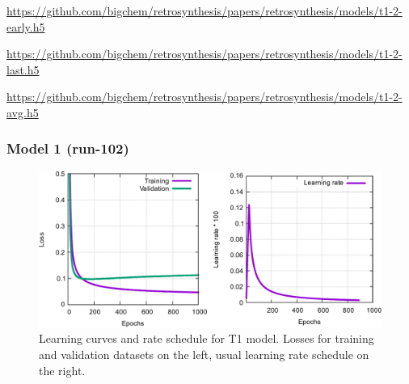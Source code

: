 \documentclass{article}
\begin{document}
\url{https://github.com/bigchem/retrosynthesis/papers/retrosynthesis/models/t1-2-early.h5}

\url{https://github.com/bigchem/retrosynthesis/papers/retrosynthesis/models/t1-2-last.h5}

\url{https://github.com/bigchem/retrosynthesis/papers/retrosynthesis/models/t1-2-avg.h5}

\newpage

\subsubsection{Model 1 (run-102)}
  
\begin{figure}[h!]
  \centering
  \includegraphics[width = 16.5cm]{images/t1-3.pdf}
  \caption{Learning curves and rate schedule for T1 model. Losses for training and validation datasets on the left, usual learning rate schedule on the right.}
  \label{fig:t11}
\end{figure}
\end{document}
